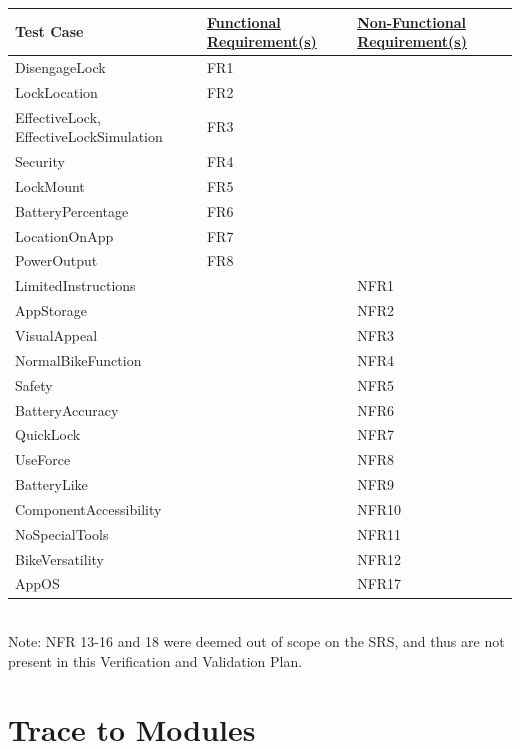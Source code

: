 \documentclass[12pt, titlepage]{article}
\begin{document}
\begin{minipage}{\textwidth}
\footnotesize
{}
\renewcommand*{\arraystretch}{1.5}
\begin{tabular}{| p{} | p{} | p{} |}
 \hline
 Test Case & \href{https://github.com/NevoAbigail/Capstone/blob/main/docs/SRS/SRS.pdf}{Functional Requirement(s)} & \href{https://github.com/NevoAbigail/Capstone/blob/main/docs/SRS/SRS.pdf}{Non-Functional Requirement(s)} \\ 
 \hline
 DisengageLock & FR1 &  \\ 
  \hline
 LockLocation & FR2 &  \\ 
  \hline
 EffectiveLock, EffectiveLockSimulation & FR3 &  \\ 
  \hline
 Security & FR4 &  \\ 
  \hline
 LockMount & FR5 &  \\ 
  \hline
 BatteryPercentage & FR6 &  \\ 
  \hline
 LocationOnApp & FR7 &  \\ 
  \hline
 PowerOutput & FR8 &  \\ 
  \hline
 LimitedInstructions & & NFR1 \\
 \hline
  AppStorage & & NFR2 \\
 \hline
  VisualAppeal & & NFR3 \\
 \hline
  NormalBikeFunction & & NFR4 \\
 \hline
  Safety & & NFR5 \\
 \hline
  BatteryAccuracy & & NFR6 \\
 \hline
  QuickLock & & NFR7 \\
 \hline
 UseForce & & NFR8 \\
 \hline
 BatteryLike & & NFR9 \\
 \hline
  ComponentAccessibility & & NFR10 \\
 \hline
  NoSpecialTools & & NFR11 \\
 \hline
  BikeVersatility & & NFR12 \\
 \hline
  AppOS & & NFR17 \\
 \hline
 \end{tabular}
\end{minipage}\\

Note: NFR 13-16 and 18 were deemed out of scope on the SRS, and thus are not present in this Verification and Validation Plan. 
		
\section{Trace to Modules}	
\end{document}
